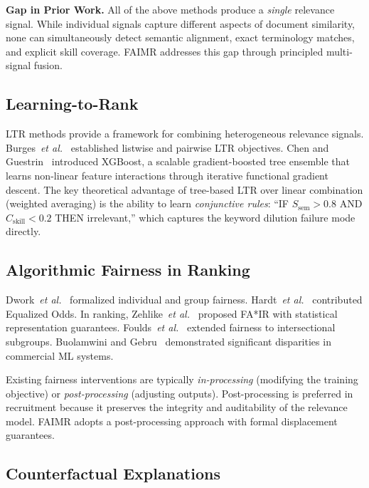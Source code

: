 \documentclass{svproc}
\begin{document}
\textbf{Gap in Prior Work.} All of the above methods produce a \textit{single} relevance signal. While individual signals capture different aspects of document similarity, none can simultaneously detect semantic alignment, exact terminology matches, and explicit skill coverage. FAIMR addresses this gap through principled multi-signal fusion.

\subsection{Learning-to-Rank}

LTR methods provide a framework for combining heterogeneous relevance signals. Burges~\textit{et al.}~\cite{burges2005learning} established listwise and pairwise LTR objectives. Chen and Guestrin~\cite{chen2016xgboost} introduced XGBoost, a scalable gradient-boosted tree ensemble that learns non-linear feature interactions through iterative functional gradient descent. The key theoretical advantage of tree-based LTR over linear combination (weighted averaging) is the ability to learn \textit{conjunctive rules}: ``IF $S_\text{sem} > 0.8$ AND $C_\text{skill} < 0.2$ THEN irrelevant,'' which captures the keyword dilution failure mode directly.

\subsection{Algorithmic Fairness in Ranking}

Dwork~\textit{et al.}~\cite{dwork2012fairness} formalized individual and group fairness. Hardt~\textit{et al.}~\cite{hardt2016equality} contributed Equalized Odds. In ranking, Zehlike~\textit{et al.}~\cite{zehlike2017fa} proposed FA*IR with statistical representation guarantees. Foulds~\textit{et al.}~\cite{foulds2020intersectional} extended fairness to intersectional subgroups. Buolamwini and Gebru~\cite{buolamwini2018gender} demonstrated significant disparities in commercial ML systems.

Existing fairness interventions are typically \textit{in-processing} (modifying the training objective) or \textit{post-processing} (adjusting outputs). Post-processing is preferred in recruitment because it preserves the integrity and auditability of the relevance model. FAIMR adopts a post-processing approach with formal displacement guarantees.

\subsection{Counterfactual Explanations}
\end{document}
